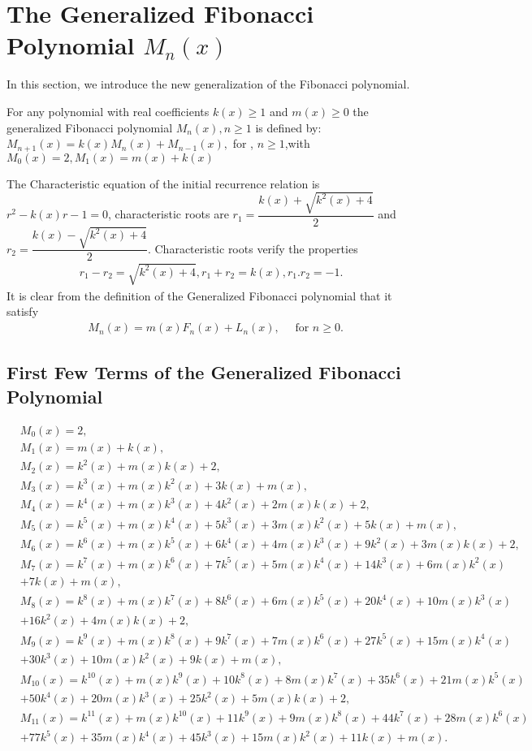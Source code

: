 \section{The Generalized Fibonacci Polynomial $M_{n}(x)$}
In this section, we introduce the new generalization of the  Fibonacci polynomial.
\begin{definition}
For any polynomial with real coefficients $k(x)\geq{1}$ and $m(x)\geq{0}$ the generalized Fibonacci polynomial $M_{n}(x),n\geq{1}$ is defined by:
$M_{n+1}(x)=k(x)M_{n}(x)+M_{n-1}(x),$  for , $n\geq{1}$,with $M_{0}(x)=2,M_{1}(x)=m(x)+k(x)$
\end{definition}
The Characteristic equation of the initial recurrence relation is  $r^{2}-k(x)r-1=0$, characteristic roots are $r_{1}=\dfrac{k(x)+\sqrt{k^{2}(x)+4}}{2}$ and $r_{2}=\dfrac{k(x)-\sqrt{k^{2}(x)+4}}{2}$. Characteristic roots verify the properties
\begin{align*}
r_{1}-r_{2}=\sqrt{k^{2}(x)+4},r_{1}+r_{2}=k(x),r_{1}.r_{2}=-1.
\end{align*}
It is clear from the definition of the Generalized Fibonacci polynomial that it satisfy
\begin{align*}
&M_{n}(x)= m(x) F_{n}(x)+L_{n}(x),\quad\text{ for  $n\geq{0}$}.
\end{align*}
\subsection{First Few Terms of the Generalized Fibonacci Polynomial}
\begin{align*}
&M_{0}(x)=2,\\
&M_{1}(x)=m(x)+k(x),\\
&M_{2}(x)=k^2(x)+m(x) k(x)+2,\\
&M_{3}(x)=k^3(x)+m(x) k^2(x)+3k(x)+m(x),\\
&M_{4}(x)=k^4(x)+m(x) k^3(x)+4k^2(x)+2m(x) k(x)+2,\\
&M_{5}(x)=k^5(x)+m(x) k^4(x)+5k^3(x)+3m(x) k^2(x)+5k(x)+m(x),\\
&M_{6}(x)=k^6(x)+m(x)k^5(x)+6k^4(x)+4m(x) k^3(x)+9k^2(x)+3 m(x) k(x)+2,\\
&M_{7}(x)=k^7(x)+m(x) k^6(x)+7k^5(x)+5m(x) k^4(x)+14k^3(x)+6m(x) k^2(x)\\&+7k(x)+m(x),\\
&M_{8}(x)=k^8(x)+m(x) k^7(x)+8k^6(x)+6m(x) k^5(x)+20k^4(x)+10m(x)k^3(x)\\&+16k^2(x)+4m(x)k(x)+2,\\
&M_{9}(x)=k^9(x)+m (x)k^8(x)+9k^7(x)+7m (x)k^6(x)+27k^5(x)+15m (x)k^4(x)\\&+30k^3(x)+10m (x)k^2(x)+9k(x)+m(x),\\
&M_{10}(x)=k^{10}(x)+m(x)k^9(x)+10k^8(x)+8m (x)k^7(x)+35k^6(x)+21m (x)k^5(x)\\&+50k^4(x)+20m (x)k^3(x)+25k^2(x)+5m(x)k(x)+2,\\
&M_{11}(x)=k^{11}(x)+m (x)k^{10}(x)+11k^9(x)+9m (x)k^8(x)+44 k^7(x)+28m (x)k^6(x)\\&+77k^5(x)+35m (x)k^4(x)+45k^3(x)+15m (x)k^2(x)+11k(x)+m(x).		
\end{align*}
